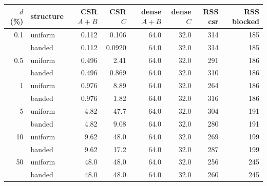 \begin{tabular}{rlrrrrrr}
\toprule
$d$ (\%) & structure & CSR $A{+}B$ & CSR $C$ & dense $A{+}B$ & dense $C$ & RSS csr & RSS blocked \\
\midrule
0.1 & uniform & 0.112 & 0.106 & 64.0 & 32.0 & 314 & 185 \\
 & banded & 0.112 & 0.0920 & 64.0 & 32.0 & 314 & 185 \\
0.5 & uniform & 0.496 & 2.41 & 64.0 & 32.0 & 291 & 186 \\
 & banded & 0.496 & 0.869 & 64.0 & 32.0 & 310 & 186 \\
1 & uniform & 0.976 & 8.89 & 64.0 & 32.0 & 264 & 186 \\
 & banded & 0.976 & 1.82 & 64.0 & 32.0 & 316 & 186 \\
5 & uniform & 4.82 & 47.7 & 64.0 & 32.0 & 304 & 191 \\
 & banded & 4.82 & 9.08 & 64.0 & 32.0 & 280 & 191 \\
10 & uniform & 9.62 & 48.0 & 64.0 & 32.0 & 269 & 199 \\
 & banded & 9.62 & 17.2 & 64.0 & 32.0 & 287 & 199 \\
50 & uniform & 48.0 & 48.0 & 64.0 & 32.0 & 256 & 245 \\
 & banded & 48.0 & 48.0 & 64.0 & 32.0 & 260 & 245 \\
\bottomrule
\end{tabular}
